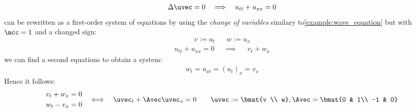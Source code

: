 \begin{examplebox}\nospacing
    \begin{example}\label{example:laplace's_equations}
        \begin{align*}
         \Delta \uvec=0&&\implies&&u_{tt}+u_{xx}=0
        \end{align*}
        can be rewritten as a first-order system of equations by using the \textit{change of variables} similary to\cref{example:wave_equation} but
        with $\mcc=1$ and a changed sign:
        \begin{align*}
          v:=u_{t}&&w:=u_{x}
        \end{align*}
        \begin{align*}
         u_{tt}+u_{xx}=0&&\implies&&v_{t}+w_{x}
        \end{align*}
        we can find a second equations to obtain a system:
        \begin{align*}
          w_{t}=u_{xt}=\left(u_{t}\right)_{x}=v_{x}
        \end{align*}
        Hence it follows:
        \begin{alignat}{4}
          \begin{aligned}
            v_{t}+w_{x}&=0\\
            w_{t}-v_{x}&=0
          \end{aligned}&&\iff&& \uvec_{t}+\Avec\uvec_{x}=0&\quad&\uvec:=\bmat{v \\ w},\Avec=\bmat{0 & 1\\ -1 & 0}
        \end{alignat}
    \end{example}
\end{examplebox}
